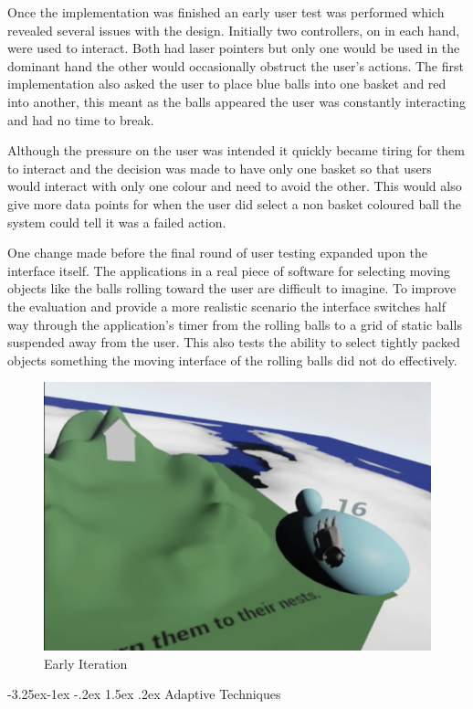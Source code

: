 \documentclass[12pt]{article}
\makeatletter
\renewcommand{\subsection}{\@startsection{subsection}{2}{\z@}%
             {-3.25ex\@plus -1ex \@minus -.2ex}%
             {1.5ex \@plus .2ex}%
             {\normalfont\large\scshape\bfseries}}
\makeatother
\begin{document}
Once the implementation was finished an early user test was performed which revealed several issues with the design. Initially two controllers, on in each hand, were used to interact. Both had laser pointers but only one would be used in the dominant hand the other would occasionally obstruct the user's actions. The first implementation also asked the user to place blue balls into one basket and red into another, this meant as the balls appeared the user was constantly interacting and had no time to break.

Although the pressure on the user was intended it quickly became tiring for them to interact and the decision was made to have only one basket so that users would interact with only one colour and need to avoid the other. This would also give more data points for when the user did select a non basket coloured ball the system could tell it was a failed action.

One change made before the final round of user testing expanded upon the interface itself. The applications in a real piece of software for selecting moving objects like the balls rolling toward the user are difficult to imagine. To improve the evaluation and provide a more realistic scenario the interface switches half way through the application's timer from the rolling balls to a grid of static balls suspended away from the user. This also tests the ability to select tightly packed objects something the moving interface of the rolling balls did not do effectively.

\begin{figure}
\centering
  \includegraphics[width=.8\linewidth]{earlydemo.png}
  \caption{Early Iteration}
\end{figure}


\subsection{Adaptive Techniques}
\end{document}
